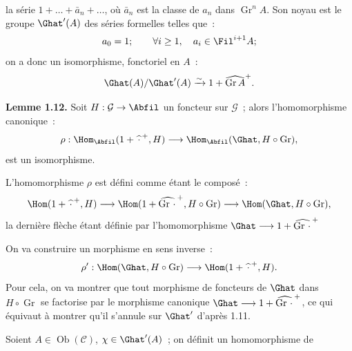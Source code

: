 la série \(1+\ldots+\bar a_n+\ldots\), où \(\bar a_n\) est la classe de \(a_n\) dans \(\operatorname{Gr}^nA\). Son
noyau est le groupe \(\Ghat'(A)\) des séries formelles telles que~:
\[
  a_0=1;\qquad \forall i\geq1,\quad a_i\in\Fil^{i+1}A;
\]
on a donc un isomorphisme, fonctoriel en \(A\)~:
\[
  \Ghat(A)/\Ghat'(A)\xrightarrow{\sim}1+\widehat{\operatorname{Gr}A}^{+}.
\]

\textbf{Lemme 1.12.} Soit \(H:\mathcal G\to\Abfil\) un foncteur sur \(\mathcal G\)~; alors l'homomorphisme canonique~:
\[
  \rho:\Hom_{\Abfil}(1+\widehat{\,\cdot\,}^{+},H)
  \longrightarrow
  \Hom_{\Abfil}(\Ghat,H\circ\operatorname{Gr}),
\]
est un isomorphisme.

L'homomorphisme \(\rho\) est défini comme étant le composé~:
\[
  \Hom(1+\widehat{\,\cdot\,}^{+},H)
  \longrightarrow
  \Hom(1+\widehat{\operatorname{Gr}\,\cdot\,}^{+},H\circ\operatorname{Gr})
  \longrightarrow
  \Hom(\Ghat,H\circ\operatorname{Gr}),
\]
la dernière flèche étant définie par l'homomorphisme \(\Ghat\longrightarrow1+\widehat{\operatorname{Gr}\,\cdot\,}^{+}\)

On va construire un morphisme en sens inverse~:
\[
  \rho':\Hom(\Ghat,H\circ\operatorname{Gr})
  \longrightarrow
  \Hom(1+\widehat{\,\cdot\,}^{+},H).
\]
Pour cela, on va montrer que tout morphisme de foncteurs de \(\Ghat\) dans \(H\circ\operatorname{Gr}\) se factorise par le morphisme canonique \(\Ghat\longrightarrow1+\widehat{\operatorname{Gr}\,\cdot\,}^{+}\), ce qui équivaut à montrer qu'il s'annule sur \(\Ghat'\) d'après 1.11.

Soient \(A\in\operatorname{Ob}(\mathcal C)\), \(\chi\in\Ghat'(A)\)~; on définit un homomorphisme de
